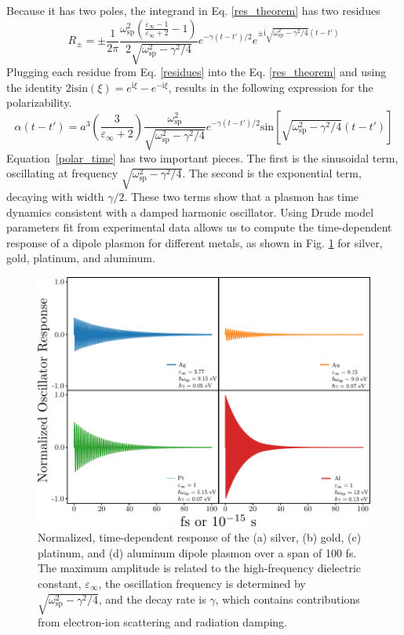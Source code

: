 \documentclass [11pt, proquest] {uwthesis}[2016/11/22]
\begin{document}
Because it has two poles, the integrand in Eq. \ref{res_theorem} has two residues
\begin{equation}
R_{\pm} = \pm\frac{1}{2\pi}\frac{\omega_{\textrm{sp}}^2\left(\frac{\varepsilon_{\infty}-1}{\varepsilon_{\infty}+2}-1\right)}{2\sqrt{\omega_\textrm{sp}^2-\gamma^2/4}}e^{-\gamma (t-t')/2}e^{\pm\textrm{i}\sqrt{\omega_\textrm{sp}^2-\gamma^2/4}(t-t')}
\label{residues}
\end{equation}
Plugging each residue from Eq. \ref{residues} into the Eq. \ref{res_theorem} and using the identity $2\textrm{i}\textrm{sin}(\xi) = e^{\textrm{i}\xi} - e^{-\textrm{i}\xi}$, results in the following expression for the polarizability.
\begin{equation}
\alpha(t-t') = a^3\left(\frac{3}{\varepsilon_{\infty}+2}\right)\frac{\omega_{\textrm{sp}}^2}{\sqrt{\omega_\textrm{sp}^2-\gamma^2/4}}e^{-\gamma (t-t')/2}\textrm{sin}\left[\sqrt{\omega_{\textrm{sp}}^2-\gamma^2/4}(t-t')\right]
\label{polar_time}
\end{equation}
Equation~\ref{polar_time} has two important pieces. The first is the sinusoidal term, oscillating at frequency $\sqrt{\omega_\textrm{sp}^2-\gamma^2/4}$. The second is the exponential term, decaying with width $\gamma/2$. These two terms show that a plasmon has time dynamics consistent with a damped harmonic oscillator. Using Drude model parameters fit from experimental data\cite{JC,Rakic,Weaver,Segall} allows us to compute the time-dependent response of a dipole plasmon for different metals, as shown in Fig. \ref{alpha_metals} for silver, gold, platinum, and aluminum.

\begin{figure}
\begin{centering}
\includegraphics{all_alpha.pdf}
\caption{Normalized, time-dependent response of the (a) silver, (b) gold, (c) platinum, and (d) aluminum dipole plasmon over a span of 100 fs. The maximum amplitude is related to the high-frequency dielectric constant, $\varepsilon_{\infty}$, the oscillation frequency is determined by $\sqrt{\omega_{\textrm{sp}}^2 - \gamma^2/4}$, and the decay rate is $\gamma$, which contains contributions from electron-ion scattering and radiation damping.}
\label{alpha_metals}
\end{centering}
\end{figure}
\end{document}
